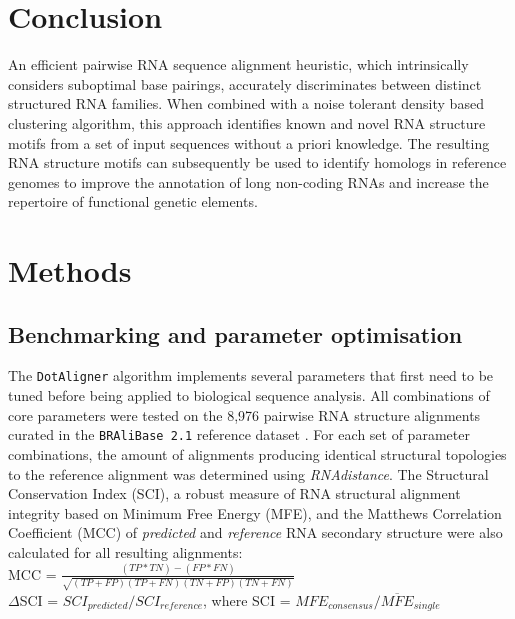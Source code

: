\documentclass{bmcart}
\newcommand\dotaligner{\texttt{DotAligner}}
\newcommand\bralibase{\texttt{BRAliBase 2.1}}
\begin{document}
\section*{Conclusion}
An efficient pairwise RNA sequence alignment heuristic, which intrinsically considers
suboptimal base pairings, accurately discriminates between distinct structured RNA families.
When combined with a noise tolerant density based clustering algorithm, this 
approach identifies known and novel RNA structure motifs from a set of input sequences 
without a priori knowledge. The resulting RNA structure motifs can subsequently 
be used to identify homologs in reference genomes to improve the annotation of 
long non-coding RNAs and increase the repertoire of functional genetic elements. 


\section*{Methods} 
\subsection*{Benchmarking and parameter optimisation}

The \dotaligner{} algorithm implements several parameters that
first need to be tuned before being applied to biological sequence
analysis. All combinations of core parameters were tested on the 8,976
pairwise RNA structure alignments curated in the \bralibase{} reference dataset
\cite{wilm2006enhanced}. For each set of parameter combinations, the amount of
alignments producing identical structural topologies to the reference alignment
was determined using \textit{RNAdistance}. The Structural Conservation Index
(SCI), a robust measure of RNA structural alignment integrity
\cite{gruber2008strategies} based on Minimum Free Energy (MFE), and the Matthews Correlation Coefficient (MCC) of \textit{predicted} and \textit{reference} RNA secondary structure
were also calculated for all resulting alignments: \\

MCC = $\frac{(TP * TN) - (FP * FN)}{ \sqrt{ (TP + FP)(TP + FN)(TN + FP)(TN + FN) }}$\\

$\Delta$SCI = $SCI_{predicted} / SCI_{reference}$, where SCI = $ MFE_{consensus}  / \overline{MFE}_{single}  $\\
\end{document}
